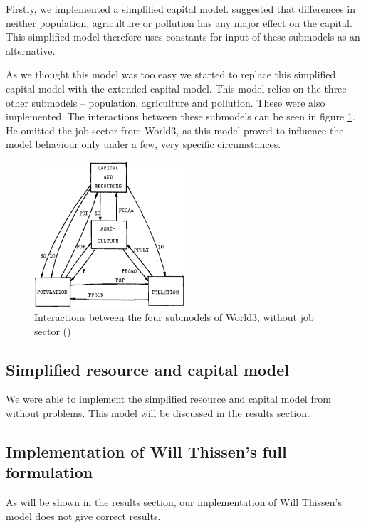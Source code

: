 \documentclass[10pt,a4paper]{scrartcl}
\begin{document}
Firstly, we implemented a simplified capital model. \cite{thissen1978investigations} suggested that differences in neither population, agriculture or pollution has any major effect on the capital. This simplified model therefore uses constants for input of these submodels as an alternative.

As we thought this model was too easy we started to replace this simplified capital model with the extended capital model. This model relies on the three other submodels – population, agriculture and pollution. These were also implemented. The interactions between these submodels can be seen in figure \ref{interactions}. He omitted the job sector from World3, as this model proved to influence the model behaviour only under a few, very specific circumstances.

\begin{figure}
\centering
\includegraphics[width=0.5\textwidth]{./plaatjes/submodel-interactions.png}
\caption{Interactions between the four submodels
of World3, without job sector (\cite{thissen1978investigations})}
\label{interactions}
\end{figure}

\subsection*{Simplified resource and capital model}

We were able to implement the simplified resource and capital model from \cite{thissen1978investigations} without problems. This model will be discussed in the results section.

\subsection*{Implementation of Will Thissen's full formulation}

As will be shown in the results section, our implementation of Will Thissen's model does not give correct results.
\end{document}
